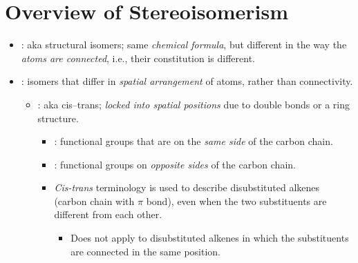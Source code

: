 \documentclass{inVerba-notes}
\begin{document}
    \section{Overview of Stereoisomerism}
    \begin{itemize}
        \item {}: aka structural isomers; same \emph{chemical formula}, but different in the way the \emph{atoms are connected}, i.e., their constitution is different.
        \item {}: isomers that differ in \emph{spatial arrangement} of atoms, rather than connectivity.
            \begin{itemize}
                \item {}: aka cis--trans; \emph{locked into spatial positions} due to double bonds or a ring structure.
                    \begin{itemize}
                        \item {}: functional groups that are on the \emph{ same side} of the carbon chain.
                        \item {}: functional groups on \emph{opposite sides} of the carbon chain.
                        \item \textit{Cis-trans} terminology is used to describe disubstituted alkenes (carbon chain with \(\pi \) bond), even when the two substituents are different from each other.
                            \begin{itemize}
                                \item Does not apply to disubstituted alkenes in which the substituents are connected in the same position.
                            \end{itemize}
                    \end{itemize}
            \end{itemize}

\end{itemize}
\end{document}

